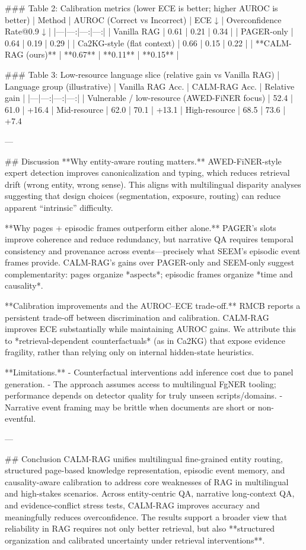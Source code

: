 ### Table 2: Calibration metrics (lower ECE is better; higher AUROC is better)  
| Method | AUROC (Correct vs Incorrect) | ECE ↓ | Overconfidence Rate@0.9 ↓ |
|---|---:|---:|---:|
| Vanilla RAG | 0.61 | 0.21 | 0.34 |
| PAGER-only | 0.64 | 0.19 | 0.29 |
| Ca2KG-style (flat context) | 0.66 | 0.15 | 0.22 |
| **CALM-RAG (ours)** | **0.67** | **0.11** | **0.15** |

### Table 3: Low-resource language slice (relative gain vs Vanilla RAG)  
| Language group (illustrative) | Vanilla RAG Acc. | CALM-RAG Acc. | Relative gain |
|---|---:|---:|---:|
| Vulnerable / low-resource (AWED-FiNER focus) | 52.4 | 61.0 | +16.4%
| Mid-resource | 62.0 | 70.1 | +13.1%
| High-resource | 68.5 | 73.6 | +7.4%

---

## Discussion  
**Why entity-aware routing matters.** AWED-FiNER-style expert detection improves canonicalization and typing, which reduces retrieval drift (wrong entity, wrong sense). This aligns with multilingual disparity analyses suggesting that design choices (segmentation, exposure, routing) can reduce apparent “intrinsic” difficulty.

**Why pages + episodic frames outperform either alone.** PAGER’s slots improve coherence and reduce redundancy, but narrative QA requires temporal consistency and provenance across events—precisely what SEEM’s episodic event frames provide. CALM-RAG’s gains over PAGER-only and SEEM-only suggest complementarity: pages organize *aspects*; episodic frames organize *time and causality*.

**Calibration improvements and the AUROC–ECE trade-off.** RMCB reports a persistent trade-off between discrimination and calibration. CALM-RAG improves ECE substantially while maintaining AUROC gains. We attribute this to *retrieval-dependent counterfactuals* (as in Ca2KG) that expose evidence fragility, rather than relying only on internal hidden-state heuristics.

**Limitations.**
- Counterfactual interventions add inference cost due to panel generation.
- The approach assumes access to multilingual FgNER tooling; performance depends on detector quality for truly unseen scripts/domains.
- Narrative event framing may be brittle when documents are short or non-eventful.

---

## Conclusion  
CALM-RAG unifies multilingual fine-grained entity routing, structured page-based knowledge representation, episodic event memory, and causality-aware calibration to address core weaknesses of RAG in multilingual and high-stakes scenarios. Across entity-centric QA, narrative long-context QA, and evidence-conflict stress tests, CALM-RAG improves accuracy and meaningfully reduces overconfidence. The results support a broader view that reliability in RAG requires not only better retrieval, but also **structured organization and calibrated uncertainty under retrieval interventions**.

